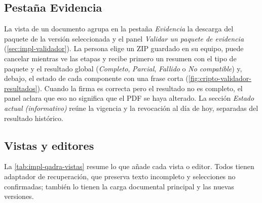 \subsection{Pestaña Evidencia}\label{sec:impl-qadra-evidencia}

La vista de un documento agrupa en la pestaña \emph{Evidencia} la descarga del paquete de la versión seleccionada y el panel \emph{Validar un paquete de evidencia} (\cref{sec:impl-validador}). La persona elige un ZIP guardado en su equipo, puede cancelar mientras ve las etapas y recibe primero un resumen con el tipo de paquete y el resultado global (\emph{Completo}, \emph{Parcial}, \emph{Fallido} o \emph{No compatible}) y, debajo, el estado de cada componente con una frase corta (\cref{fig:cripto-validador-resultados}). Cuando la firma es correcta pero el resultado no es completo, el panel aclara que eso no significa que el PDF se haya alterado. La sección \emph{Estado actual (informativo)} reúne la vigencia y la revocación al día de hoy, separadas del resultado histórico.

\subsection{Vistas y editores}\label{sec:impl-qadra-vistas}

La \cref{tab:impl-qadra-vistas} resume lo que añade cada vista o editor. Todos tienen adaptador de recuperación, que preserva texto incompleto y selecciones no confirmadas; también lo tienen la carga documental principal y las nuevas versiones.

\begingroup

